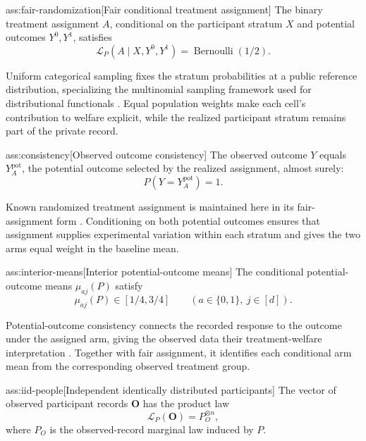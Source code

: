 \documentclass[11pt]{article}
\begin{document}
\begin{assumptionv}{ass:fair-randomization}[Fair conditional treatment assignment]
The binary treatment assignment \(A\), conditional on the participant stratum \(X\) and potential outcomes \(Y^0,Y^1\), satisfies
\[
\mathcal L_P(A\mid X,Y^0,Y^1)=\operatorname{Bernoulli}(1/2).
\]
\end{assumptionv}

Uniform categorical sampling fixes the stratum probabilities at a public reference distribution, specializing the multinomial sampling framework used for distributional functionals \citep{JiaoHanWeissman2018L1}. Equal population weights make each cell's contribution to welfare explicit, while the realized participant stratum remains part of the private record.

\begin{assumptionv}{ass:consistency}[Observed outcome consistency]
The observed outcome \(Y\) equals \(Y^{\mathrm{pot}}_A\), the potential outcome selected by the realized assignment, almost surely:
\[
P(Y=Y^{\mathrm{pot}}_A)=1.
\]
\end{assumptionv}

Known randomized treatment assignment is maintained here in its fair-assignment form \citep{OhnishiAwan2025Randomized}. Conditioning on both potential outcomes ensures that assignment supplies experimental variation within each stratum and gives the two arms equal weight in the baseline mean.

\begin{assumptionv}{ass:interior-means}[Interior potential-outcome means]
The conditional potential-outcome means \(\mu_{aj}(P)\) satisfy
\[
\mu_{aj}(P)\in[1/4,3/4]
\qquad(a\in\{0,1\},\ j\in[d]).
\]
\end{assumptionv}

Potential-outcome consistency connects the recorded response to the outcome under the assigned arm, giving the observed data their treatment-welfare interpretation \citep{LuedtkeVanDerLaan2016OptimalValue}. Together with fair assignment, it identifies each conditional arm mean from the corresponding observed treatment group.

\begin{assumptionv}{ass:iid-people}[Independent identically distributed participants]
The vector of observed participant records \(\mathbf O\) has the product law
\[
\mathcal L_P(\mathbf O)=P_O^{\otimes n},
\]
where \(P_O\) is the observed-record marginal law induced by \(P\).
\end{assumptionv}
\end{document}
